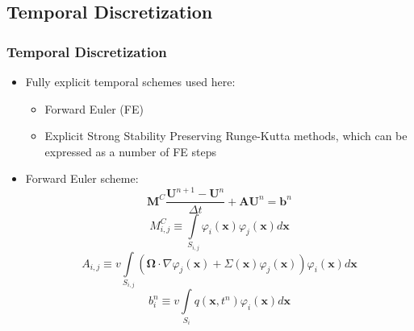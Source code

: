 \documentclass{beamer}
\newcommand{\x}{\mathbf{x}}
\renewcommand{\ij}{_{i,j}}
\newcommand{\U}{\mathbf{U}}
\newcommand{\M}{\mathbf{M}}
\newcommand{\A}{\mathbf{A}}
\renewcommand{\b}{\mathbf{b}}
\newcommand{\dt}{\Delta t}
\begin{document}
\subsection{Temporal Discretization}
\begin{frame}
\frametitle{Temporal Discretization}

\begin{itemize}
   \item Fully explicit temporal schemes used here:
   \begin{itemize}
      \item Forward Euler (FE)
      \item Explicit Strong Stability Preserving Runge-Kutta methods,
         which can be expressed as a number of FE steps
   \end{itemize}
   \item Forward Euler scheme:
   \begin{equation}\label{eq:exgalerkin}
      \M^C\frac{\U^{n+1}-\U^n}{\dt} + \A\U^n = \b^n
   \end{equation}
   \begin{equation}
      M\ij^C \equiv \int\limits_{S\ij}\varphi_i(\x) \varphi_j(\x) d\x
   \end{equation}
   \begin{equation}
      A\ij \equiv v\int\limits_{S\ij}\left(
      \mathbf{\Omega}\cdot\nabla\varphi_j(\x) +
		\Sigma(\x)\varphi_j(\x)\right)\varphi_i(\x) d\x
   \end{equation}
   \begin{equation}
      b_i^n \equiv v\int\limits_{S_i} q(\x,t^n)\varphi_i(\x) d\x
   \end{equation}
\end{itemize}

\end{frame}
\end{document}
